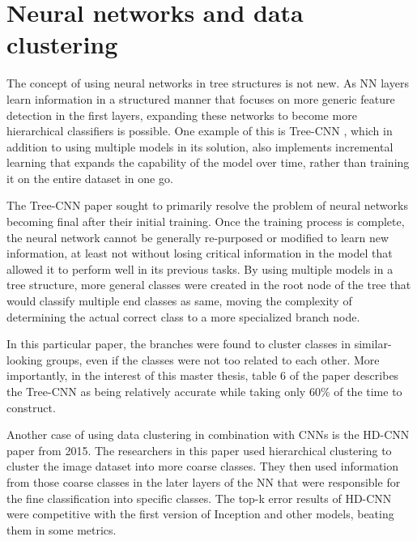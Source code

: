 \section{Neural networks and data clustering}
The concept of using neural networks in tree structures is not new. 
As NN layers learn information in a structured manner that focuses on more generic feature detection in the first layers, expanding these networks to become more hierarchical classifiers is possible. 
One example of this is Tree-CNN \cite{roy2018treecnn}, which in addition to using multiple models in its solution, also implements incremental learning that expands the capability of the model over time, rather than training it on the entire dataset in one go.

The Tree-CNN paper sought to primarily resolve the problem of neural networks becoming final after their initial training. 
Once the training process is complete, the neural network cannot be generally re-purposed or modified to learn new information, at least not without losing critical information in the model that allowed it to perform well in its previous tasks. 
By using multiple models in a tree structure, more general classes were created in the root node of the tree that would classify multiple end classes as same, moving the complexity of determining the actual correct class to a more specialized branch node. 

In this particular paper, the branches were found to cluster classes in similar-looking groups, even if the classes were not too related to each other. 
More importantly, in the interest of this master thesis, table 6 of the paper describes the Tree-CNN as being relatively accurate while taking only 60\% of the time to construct. 

Another case of using data clustering in combination with CNNs is the HD-CNN paper\cite{hdcnn} from 2015.
The researchers in this paper used hierarchical clustering to cluster the image dataset into more coarse classes.
They then used information from those coarse classes in the later layers of the NN that were responsible for the fine classification into specific classes.
The top-k error results of HD-CNN were competitive with the first version of Inception\cite{szegedy2014going} and other models, beating them in some metrics.



